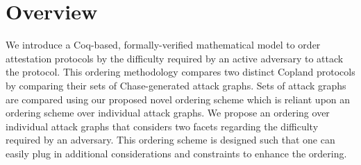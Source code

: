 \documentclass[runningheads]{llncs}
\theoremstyle{definition}
\begin{document}





\section{Overview}
We introduce a Coq-based, formally-verified mathematical model to order attestation protocols by the difficulty required by an active adversary to attack the protocol. This ordering methodology compares two distinct Copland protocols by comparing their sets of Chase-generated attack graphs. Sets of attack graphs are compared using our proposed novel ordering scheme which is reliant upon an ordering scheme over individual attack graphs. We propose an ordering over individual attack graphs that considers two facets regarding the difficulty required by an adversary. This ordering scheme is designed such that one can easily plug in additional considerations and constraints to enhance the ordering.
\end{document}
